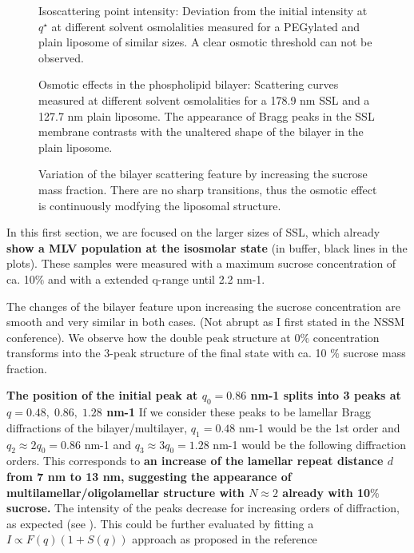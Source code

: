 \begin{figure}
	\centering
		
		\caption{Isoscattering point intensity: Deviation from the initial intensity at $q^{\star}$ at different solvent osmolalities measured for a PEGylated and plain liposome of similar sizes. A clear osmotic threshold can not be observed.}
		\label{fig:SSLIsopointIntensity}
\end{figure}


\begin{figure}
	\centering
		\subfloat[PEG 178.9 nm]{\resizebox{0.44\linewidth}{!}{}\label{fig:SSLContrastCurvesBilayer200SSL}}
		\subfloat[Plain 127.7 nm]{\resizebox{0.44\linewidth}{!}{}\label{fig:SSLContrastCurvesBilayer100Plain}}
		\caption{Osmotic effects in the phospholipid bilayer: Scattering curves measured at different solvent osmolalities for a 178.9 nm SSL and a 127.7 nm plain liposome. The appearance of Bragg peaks in the SSL membrane contrasts with the unaltered shape of the bilayer in the plain liposome.}
\end{figure}

\begin{figure}
	\centering
		
		\caption{Variation of the bilayer scattering feature by increasing the sucrose mass fraction. There are no sharp transitions, thus the osmotic effect is continuously modfying the liposomal structure.}
		\label{fig:SSLContrastVariationChiSquared400SSL}
\end{figure}

In this first section, we are focused on the larger sizes of SSL, which already \textbf{show a MLV population at the isosmolar state} (in buffer, black lines in the plots). These samples were measured with a maximum sucrose concentration of ca. 10$\%$ and with a extended q-range until 2.2 nm-1.

The changes of the bilayer feature upon increasing the sucrose concentration are smooth and very similar in both cases. (Not abrupt as I first stated in the NSSM conference). We observe how the double peak structure at 0$\%$ concentration transforms into the 3-peak structure of the final state with ca. 10 $\%$ sucrose mass fraction. \cite{varga_osmotic_2014}

\textbf{The position of the initial peak at $q_0=0.86$ nm-1 splits into 3 peaks at $q=0.48 ,\; 0.86  ,\; 1.28$ nm-1} If we consider these peaks to be lamellar Bragg diffractions of the bilayer/multilayer, $q_1=0.48$ nm-1 would be the 1st order and $q_{2}\approx2q_0=0.86$ nm-1 and  $q_{3}\approx3q_0=1.28$ nm-1 would be the following diffraction orders. This corresponds to \textbf{an increase of the lamellar repeat distance $d$ from 7 nm to 13 nm\cite{kenworthy_range_1995}, suggesting the appearance of multilamellar/oligolamellar structure with $N\approx2$ already with 10$\%$ sucrose.} The intensity of the peaks decrease for increasing orders of diffraction, as expected (see  \cite{fernandez_influence_2008}). This could be further evaluated by fitting a $I \propto F(q) (1+S(q))$ approach as proposed in the reference \cite{fernandez_influence_2008}


